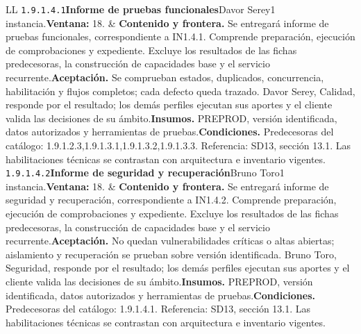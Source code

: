 \begin{longtable}{L{\tabcolsep\relax}L{\tabcolsep\relax}}
\texttt{1.\allowbreak{}9.\allowbreak{}1.\allowbreak{}4.\allowbreak{}1}\newline{}\textbf{Informe de pruebas funcionales}\newline{}Davor Serey\newline{}1 instancia.\newline{}\textbf{Ventana:} 18. & \textbf{Contenido y frontera.} Se entregará informe de pruebas funcionales, correspondiente a IN1.4.1. Comprende preparación, ejecución de comprobaciones y expediente. Excluye los resultados de las fichas predecesoras, la construcción de capacidades base y el servicio recurrente.\newline{}\textbf{Aceptación.} Se comprueban estados, duplicados, concurrencia, habilitación y flujos completos; cada defecto queda trazado. Davor Serey, Calidad, responde por el resultado; los demás perfiles ejecutan sus aportes y el cliente valida las decisiones de su ámbito.\newline{}\textbf{Insumos.} PREPROD, versión identificada, datos autorizados y herramientas de pruebas.\newline{}\textbf{Condiciones.} Predecesoras del catálogo: 1.9.1.2.3,1.9.1.3.1,1.9.1.3.2,1.9.1.3.3. Referencia: SD13, sección 13.1. Las habilitaciones técnicas se contrastan con arquitectura e inventario vigentes.\\\hline
\texttt{1.\allowbreak{}9.\allowbreak{}1.\allowbreak{}4.\allowbreak{}2}\newline{}\textbf{Informe de seguridad y recuperación}\newline{}Bruno Toro\newline{}1 instancia.\newline{}\textbf{Ventana:} 18. & \textbf{Contenido y frontera.} Se entregará informe de seguridad y recuperación, correspondiente a IN1.4.2. Comprende preparación, ejecución de comprobaciones y expediente. Excluye los resultados de las fichas predecesoras, la construcción de capacidades base y el servicio recurrente.\newline{}\textbf{Aceptación.} No quedan vulnerabilidades críticas o altas abiertas; aislamiento y recuperación se prueban sobre versión identificada. Bruno Toro, Seguridad, responde por el resultado; los demás perfiles ejecutan sus aportes y el cliente valida las decisiones de su ámbito.\newline{}\textbf{Insumos.} PREPROD, versión identificada, datos autorizados y herramientas de pruebas.\newline{}\textbf{Condiciones.} Predecesoras del catálogo: 1.9.1.4.1. Referencia: SD13, sección 13.1. Las habilitaciones técnicas se contrastan con arquitectura e inventario vigentes.\\\hline

\end{longtable}
